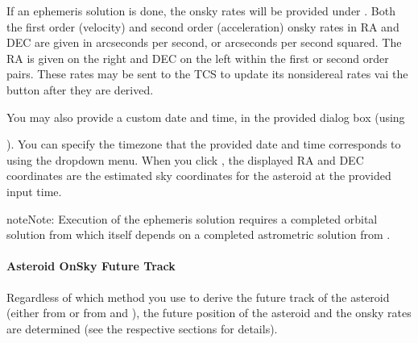 \documentclass[letterpaper,11pt,english]{sphinxmanual}
\begin{document}
\sphinxAtStartPar
If an ephemeris solution is done, the on\sphinxhyphen{}sky rates will be provided under
. Both the first order (velocity) and
second order (acceleration) on\sphinxhyphen{}sky rates in RA and DEC are given in arcseconds
per second, or arcseconds per second squared. The RA is given on the right and
DEC on the left within the first or second order pairs. These rates may be
sent to the TCS to update its non\sphinxhyphen{}sidereal rates vai the
 button after they are derived.

\sphinxAtStartPar
You may also provide a custom date and time, in the provided dialog box (using
%
\begin{footnote}[8]\sphinxAtStartFootnote
{}
%
\end{footnote}). You
can specify the timezone that the provided date and time corresponds to using
the dropdown menu. When you click , the displayed RA
and DEC coordinates are the estimated sky coordinates for the asteroid at the
provided input time.

\begin{sphinxadmonition}{note}{Note:}
\sphinxAtStartPar
Execution of the ephemeris solution requires a completed orbital
solution from {\hyperref[\detokenize{user/manual_mode:user-manual-mode-procedure-orbital-elements}]{}} which
itself depends on a completed astrometric solution from
{\hyperref[\detokenize{user/manual_mode:user-manual-mode-procedure-find-asteroid-location-compute-astrometric-solution}]{}}.
\end{sphinxadmonition}


\paragraph{Asteroid On\sphinxhyphen{}Sky Future Track}
\label{\detokenize{user/manual_mode:asteroid-on-sky-future-track}}\label{\detokenize{user/manual_mode:user-manual-procedure-asteroid-on-sky-future-track}}
\sphinxAtStartPar
Regardless of which method you use to derive the future track of the asteroid
(either from {\hyperref[\detokenize{user/manual_mode:user-manual-mode-procedure-asteroid-position-propagation}]{}} or
from {\hyperref[\detokenize{user/manual_mode:user-manual-mode-procedure-orbital-elements}]{}} and
{\hyperref[\detokenize{user/manual_mode:user-manual-mode-procedure-ephemeris}]{}}), the future position of the
asteroid and the on\sphinxhyphen{}sky rates are determined (see the respective sections
for details).
\end{document}
